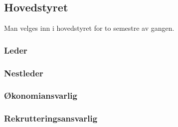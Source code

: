 \documentclass[10pt,norsk,a4paper,usenames,dvipsnames]{article}
\begin{document}
\begin{minipage}[t]{0.5\textwidth}
    \subsection{Hovedstyret}
        Man velges inn i hovedstyret for to semestre av gangen.

        \subsubsection{Leder}


        \subsubsection{Nestleder}




        \subsubsection{Økonomiansvarlig}








        \subsubsection{Rekrutteringsansvarlig}




\end{minipage}
\end{document}

